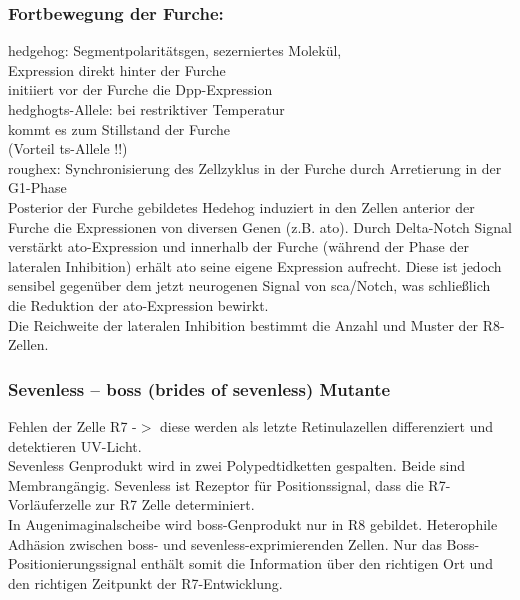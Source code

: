 \subsubsection{Fortbewegung der Furche:}
hedgehog: Segmentpolaritätsgen, sezerniertes Molekül,\\
Expression direkt hinter der Furche\\
initiiert vor der Furche die Dpp-Expression\\
hedghogts-Allele: bei restriktiver Temperatur\\
kommt es zum Stillstand der Furche\\
(Vorteil ts-Allele !!)\\
roughex: Synchronisierung des Zellzyklus in der Furche durch Arretierung in der G1-Phase\\
Posterior der Furche gebildetes Hedehog induziert in den Zellen anterior der Furche die Expressionen von diversen Genen (z.B. ato). Durch Delta-Notch Signal verstärkt ato-Expression und innerhalb der Furche (während der Phase der lateralen Inhibition) erhält ato seine eigene Expression aufrecht. Diese ist jedoch sensibel gegenüber dem jetzt neurogenen Signal von sca/Notch, was schließlich die Reduktion der ato-Expression bewirkt.\\

Die Reichweite der lateralen Inhibition bestimmt die Anzahl und Muster der R8-Zellen.\\

\subsubsection{Sevenless – boss (\textbf{b}rides \textbf{o}f sevenle\textbf{ss}) Mutante}
Fehlen der Zelle R7 -$>$ diese werden als letzte Retinulazellen differenziert und detektieren UV-Licht.\\
Sevenless Genprodukt wird in zwei Polypedtidketten gespalten. Beide sind Membrangängig. Sevenless ist Rezeptor für Positionssignal, dass die R7-Vorläuferzelle zur R7 Zelle determiniert.\\

In Augenimaginalscheibe wird boss-Genprodukt nur in R8 gebildet. Heterophile Adhäsion zwischen boss- und sevenless-exprimierenden Zellen. Nur das Boss-Positionierungssignal enthält somit die Information über den richtigen Ort und den richtigen Zeitpunkt der R7-Entwicklung.\\


